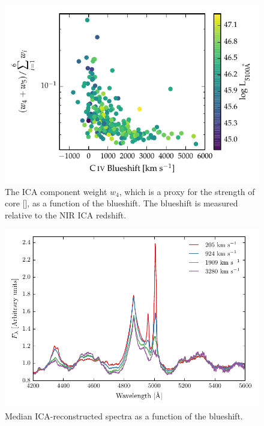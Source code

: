 \begin{figure}
    \centering
    \includegraphics[width=\textwidth]{figures/chapter04/civ_blueshift_oiii_strength.pdf} 
    \caption{The \ac{ICA} component weight $w_4$, which is a proxy for the strength of core [], as a function of the  blueshift. The  blueshift is measured relative to the NIR \ac{ICA} redshift.}     
    \label{fig:civ_blueshift_oiii_strength}
\end{figure}

\begin{figure}
    \centering
    \includegraphics[width=\columnwidth]{figures/chapter04/mfica_composites.pdf} 
    \caption{Median \ac{ICA}-reconstructed spectra as a function of the  blueshift.}     
    \label{fig:mfica_composites}
\end{figure}

